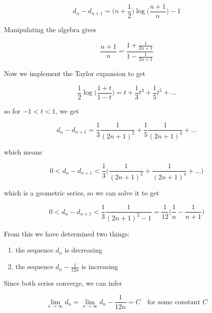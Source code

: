 \documentclass[11pt]{article}
\begin{document}
\begin{equation}
d_{n} - d_{n+1} = \bigg(n + \frac{1}{2}\bigg)\log{\bigg(\frac{n+1}{n}\bigg)} - 1
\end{equation}

\noindent Manipulating the algebra gives 

\begin{equation}
\frac{n + 1}{n} = \frac{1 + \frac{1}{2n + 1}}{1 - \frac{1}{2n + 1}}
\end{equation}

\noindent Now we implement the Taylor expansion to get 

\begin{equation}
\frac{1}{2}\log{\bigg(\frac{1+t}{1-t}\bigg)} = t + \frac{1}{3}t^{3} + \frac{1}{5}t^{5} + ... 
\end{equation}

\noindent so for $-1 < t < 1$, we get 

\begin{equation}
d_{n} - d_{n+1} = \frac{1}{3}\frac{1}{(2n + 1)^{2}} + \frac{1}{5}\frac{1}{(2n + 1)^{4}} + ... 
\end{equation}

\noindent which means 

\begin{equation}
0 < d_{n} - d_{n+1} < \frac{1}{3}\bigg(\frac{1}{(2n + 1)^{2}} + \frac{1}{(2n + 1)^{4}} + ... \bigg)
\end{equation}

\noindent which is a geometric series, so we can solve it to get 

\begin{equation}
0 < d_{n} - d_{n+1} <  \frac{1}{3}\frac{1}{(2n + 1)^{2} - 1}  = \frac{1}{12}\bigg(\frac{1}{n} - \frac{1}{n+1}\bigg)
\end{equation}

\noindent From this we have determined two things:
\begin{enumerate}
\item the sequence $d_{n}$ is decreasing
\item the sequence $d_{n} - \frac{1}{12n}$ is increasing
\end{enumerate}

\noindent Since both series converge, we can infer 

\begin{equation}
\lim_{x \to \infty} d_{n} = \lim_{x \to \infty} d_{n} - \frac{1}{12n} = C \quad \text{for some constant $C$}
\end{equation}
\end{document}
